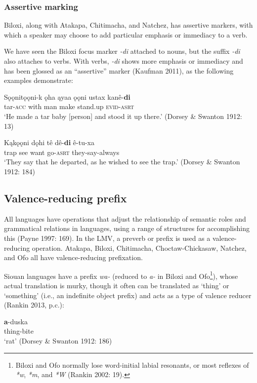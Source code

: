 \documentclass[output=paper]{LSP/langsci}
\begin{document}
\subsubsection{Assertive marking}

Biloxi, along with Atakapa, Chitimacha, and Natchez, has assertive markers, with which a speaker may choose to add particular emphasis or immediacy to a verb. 

	We have seen the Biloxi focus marker \emph{-di} attached to nouns, but the suffix \emph{-di} also attaches to verbs. With verbs, \emph{-di} shows more emphasis or immediacy and has been glossed as an “assertive” marker (Kaufman 2011), as the following examples demonstrate:

\ea
\gll	Sǫǫnitǫǫni-k ǫha ąyaa ǫǫni ustax kanê-\textbf{di} \\
	tar-\textsc{acc}  with man make stand.up \textsc{evid-asrt}\\
\glt `He made a tar baby [person] and stood it up there.' (Dorsey \& Swanton 1912: 13)
\z

\ea
\gll	Kąkǫǫni dǫhi tê dê-\textbf{di} ê-tu-xa\\
	trap 	 see want go-\textsc{asrt} they-say-always\\
\glt `They say that he departed, as he wished to see the trap.' (Dorsey \& Swanton 1912: 184)
\z

\subsection{Valence-reducing prefix}

All languages have operations that adjust the relationship of semantic roles and grammatical relations in languages, using a range of structures for accomplishing this (Payne 1997: 169). In the LMV, a preverb or prefix is used as a valence-reducing operation. Atakapa, Biloxi, Chitimacha, Choctaw-Chickasaw, Natchez, and Ofo all have valence-reducing prefixation. 	

	Siouan languages have a prefix \emph{wa-} (reduced to \emph{a-} in Biloxi and Ofo\footnote{Biloxi and Ofo normally lose word-initial labial resonants, or most reflexes of \emph{*w}, \emph{*m}, and \emph{*W} (Rankin 2002: 19).}), whose actual translation is murky, though it often can be translated as `thing' or `something' (i.e., an indefinite object prefix) and acts as a type of valence reducer (Rankin 2013, p.c.):

\ea
\gll	\textbf{a}-duska\\
		thing-bite\\
\glt	 `rat' (Dorsey \& Swanton 1912: 186)
\z
\end{document}
